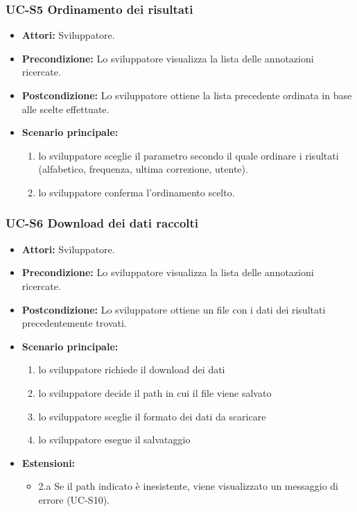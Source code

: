 	\subsubsection{UC-S5 Ordinamento dei risultati}
		\begin{itemize}
			\item \textbf{Attori:} Sviluppatore.
			\item \textbf{Precondizione:} Lo sviluppatore visualizza la lista delle annotazioni ricercate.
			\item \textbf{Postcondizione:} Lo sviluppatore ottiene la lista precedente ordinata in base alle scelte effettuate.
			\item \textbf{Scenario principale:}
				\begin{enumerate}
					\item lo sviluppatore sceglie il parametro secondo il quale ordinare i risultati (alfabetico, frequenza, ultima correzione, utente).
					\item lo sviluppatore conferma l'ordinamento scelto.
				\end{enumerate}
		\end{itemize} 
	
	\subsubsection{UC-S6 Download dei dati raccolti}
		\begin{itemize}
			\item \textbf{Attori:} Sviluppatore.
			\item \textbf{Precondizione:} Lo sviluppatore visualizza la lista delle annotazioni ricercate.
			\item \textbf{Postcondizione:} Lo sviluppatore ottiene un file con i dati dei risultati precedentemente trovati.
			\item \textbf{Scenario principale:}
				\begin{enumerate}
					\item lo sviluppatore richiede il download dei dati
					\item lo sviluppatore decide il path in cui il file viene salvato
					\item lo sviluppatore sceglie il formato dei dati da scaricare
					\item lo sviluppatore esegue il salvataggio
				\end{enumerate}
			\item \textbf{Estensioni:}
				\begin{itemize}
					\item 2.a Se il path indicato è inesistente, viene visualizzato un messaggio di errore (UC-S10).
				\end{itemize}
		\end{itemize}	
		
